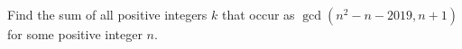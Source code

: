 Find the sum of all positive integers $k$ that occur as $\gcd(n^2-n-2019,n+1)$ for some positive integer $n$.
